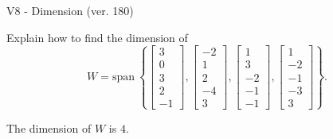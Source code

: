 \begin{exercise}
  \begin{exerciseTitle}V8 - Dimension (ver. 180)\end{exerciseTitle}
  \begin{exerciseStatement}
    Explain how to find the dimension of 
\[W=\mathrm{span}\ \left\{\left[\begin{array}{r}
3 \\
0 \\
3 \\
2 \\
-1
\end{array}\right] , \left[\begin{array}{r}
-2 \\
1 \\
2 \\
-4 \\
3
\end{array}\right] , \left[\begin{array}{r}
1 \\
3 \\
-2 \\
-1 \\
-1
\end{array}\right] , \left[\begin{array}{r}
1 \\
-2 \\
-1 \\
-3 \\
3
\end{array}\right]\right\}.\]



  \end{exerciseStatement}
  \begin{exerciseAnswer}
   The dimension of \(W\) is  \(4\).
  


  \end{exerciseAnswer}
\end{exercise}